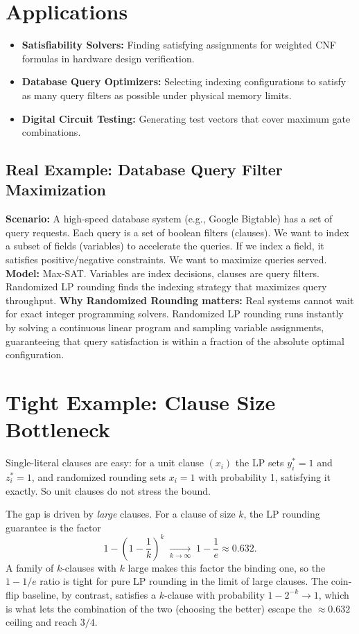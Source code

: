 \section{Applications}
\begin{itemize}
    \item \textbf{Satisfiability Solvers:} Finding satisfying assignments for weighted CNF formulas in hardware design verification.
    \item \textbf{Database Query Optimizers:} Selecting indexing configurations to satisfy as many query filters as possible under physical memory limits.
    \item \textbf{Digital Circuit Testing:} Generating test vectors that cover maximum gate combinations.
\end{itemize}

\subsection*{Real Example: Database Query Filter Maximization}
\textbf{Scenario:} A high-speed database system (e.g., Google Bigtable) has a set of query requests. Each query is a set of boolean filters (clauses). We want to index a subset of fields (variables) to accelerate the queries. If we index a field, it satisfies positive/negative constraints. We want to maximize queries served.
\textbf{Model:} Max-SAT. Variables are index decisions, clauses are query filters. Randomized LP rounding finds the indexing strategy that maximizes query throughput.
\textbf{Why Randomized Rounding matters:} Real systems cannot wait for exact integer programming solvers. Randomized LP rounding runs instantly by solving a continuous linear program and sampling variable assignments, guaranteeing that query satisfaction is within a fraction of the absolute optimal configuration.

\section{Tight Example: Clause Size Bottleneck}
Single-literal clauses are easy: for a unit clause $(x_i)$ the LP sets $y_i^* = 1$ and $z_i^* = 1$, and randomized rounding sets $x_i = 1$ with probability 1, satisfying it exactly. So unit clauses do not stress the bound.

The gap is driven by \emph{large} clauses. For a clause of size $k$, the LP rounding guarantee is the factor
\[
1 - \left(1 - \frac{1}{k}\right)^k \;\xrightarrow[k\to\infty]{}\; 1 - \frac1e \approx 0.632 .
\]
A family of $k$-clauses with $k$ large makes this factor the binding one, so the $1-1/e$ ratio is tight for pure LP rounding in the limit of large clauses. The coin-flip baseline, by contrast, satisfies a $k$-clause with probability $1 - 2^{-k} \to 1$, which is what lets the combination of the two (choosing the better) escape the $\approx 0.632$ ceiling and reach $3/4$.

